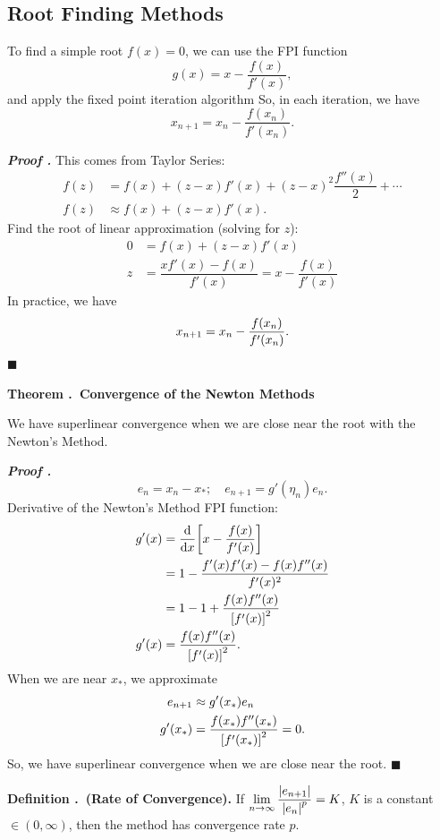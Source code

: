 \documentclass[12pt, a4paper]{article}
\newcounter{index}[subsection]
\newenvironment*{df}[1]{\par\noindent\textbf{Definition \thesubsection.\stepcounter{index}\theindex\ (#1).}}{\par}
\newenvironment*{thm}[1]{\begin{tcolorbox}\par\noindent\textbf{Theorem \thesubsection.\stepcounter{index}\theindex\ #1} \par}{\par\end{tcolorbox}}
\newcounter{nprf}[subsection]
\newenvironment*{prf}{\par\indent\textbf{\textit{Proof \stepcounter{nprf}\thenprf.}}}{\hfill$\blacksquare$\par}
\def\dsst{\displaystyle}
\begin{document}
\subsection{Root Finding Methods}
\begin{algorithm}
	\caption{Newton Iteration}
	To find a simple root $f(x)=0$, we can use the FPI function \[g(x)=x-\dfrac{f(x)}{f'(x)},\] and apply the fixed point iteration algorithm\;
	So, in each iteration, we have \[x_{n+1}=x_n-\dfrac{f(x_n)}{f'(x_n)}.\]
\end{algorithm}
\begin{prf}
	This comes from Taylor Series: \begin{align*}f(z)&=f(x)+(z-x)f'(x)+(z-x)^2\dfrac{f''(x)}{2}+\cdots\\f(z)&\approx f(x)+(z-x)f'(x).\end{align*} Find the root of linear approximation (solving for $z$): \begin{align*}0&=f(x)+(z-x)f'(x)\\z&=\dfrac{xf'(x)-f(x)}{f'(x)}=x-\dfrac{f(x)}{f'(x)}\end{align*} In practice, we have \[x_{n+1}=x_n-\dfrac{f\qty(x_n)}{f'\qty(x_n)}.\]
\end{prf}
\begin{thm}{Convergence of the Newton Methods}
	We have superlinear convergence when we are close near the root with the Newton's Method. 	
\end{thm}
\begin{prf}
	\[e_{n}=x_n-x_*;\quad e_{n+1}=g'(\eta_n)e_n.\] Derivative of the Newton's Method FPI function: \begin{align*}g'(x)&=\dv{x}\qty[x-\dfrac{f(x)}{f'(x)}]\\&=1-\dfrac{f'(x)f'(x)-f(x)f''(x)}{f'(x)^2}\\&=1-1+\dfrac{f(x)f''(x)}{\qty[f'(x)]^2}\\g'(x)&=\dfrac{f(x)f''(x)}{\qty[f'(x)]^2}.\end{align*} When we are near $x_*$, we approximate \begin{align*}e_{n+1}&\approx g'(x_*)e_n\\g'(x_*)&=\dfrac{f(x_*)f''(x_*)}{\qty[f'(x_*)]^2}=0.\end{align*} So, we have superlinear convergence when we are close near the root. 
\end{prf}
\begin{df}{Rate of Convergence}
	If $\dsst\lim_{n\to\infty}\dfrac{\qty|e_{n+1}|}{\qty|e_n|^p}=K$, $K$ is a constant $\in(0,\infty)$, then the method has convergence rate $p$.	
\end{df}
\end{document}
